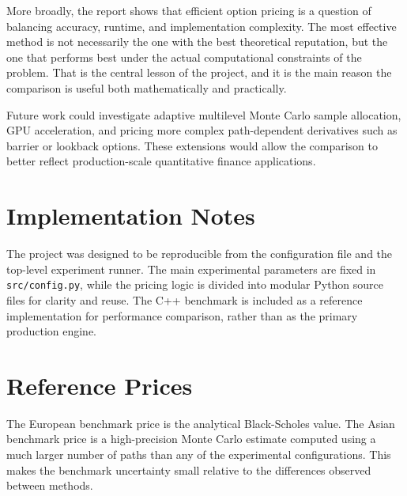 \documentclass[11pt]{article}
\begin{document}
More broadly, the report shows that efficient option pricing is a question of balancing accuracy, runtime, and implementation complexity. The most effective method is not necessarily the one with the best theoretical reputation, but the one that performs best under the actual computational constraints of the problem. That is the central lesson of the project, and it is the main reason the comparison is useful both mathematically and practically.

Future work could investigate adaptive multilevel Monte Carlo sample allocation, GPU acceleration, and pricing more complex path-dependent derivatives such as barrier or lookback options. These extensions would allow the comparison to better reflect production-scale quantitative finance applications.


\appendix

\section{Implementation Notes}

The project was designed to be reproducible from the configuration file and the top-level experiment runner. The main experimental parameters are fixed in \texttt{src/config.py}, while the pricing logic is divided into modular Python source files for clarity and reuse. The C++ benchmark is included as a reference implementation for performance comparison, rather than as the primary production engine.

\section{Reference Prices}

The European benchmark price is the analytical Black-Scholes value. The Asian benchmark price is a high-precision Monte Carlo estimate computed using a much larger number of paths than any of the experimental configurations. This makes the benchmark uncertainty small relative to the differences observed between methods.
\end{document}
